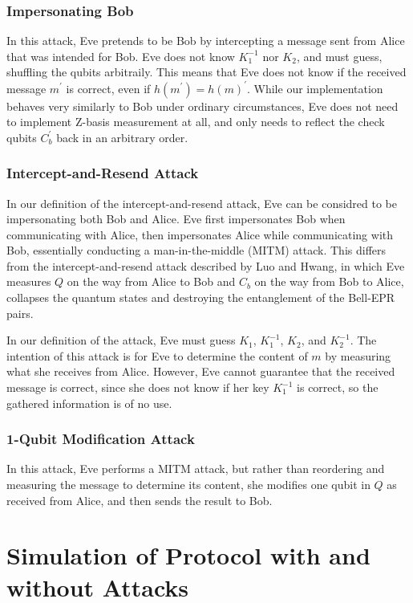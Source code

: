 \documentclass[conference,compsoc]{IEEEtran}
\begin{document}
\subsubsection{Impersonating Bob}

In this attack, Eve pretends to be Bob by intercepting a message sent from Alice that was
intended for Bob. Eve does not know $K_{1}^{-1}$ nor $K_{2}$, and must guess, shuffling the
qubits arbitraily. This means that Eve does not know if the received message $m^{\prime}$ is correct, even
if $h(m^{\prime}) = h(m)^{\prime}$. While our implementation behaves very similarly to Bob
under ordinary circumstances, Eve does not need to implement Z-basis measurement at all, and only needs
to reflect the check qubits $C_{b}^{\prime}$ back in an arbitrary order.

\subsubsection{Intercept-and-Resend Attack}

In our definition of the intercept-and-resend attack, Eve can be considred to
be impersonating both Bob and Alice. 
Eve first impersonates Bob when communicating with Alice, then impersonates
Alice while communicating with Bob, essentially conducting a man-in-the-middle (MITM) attack.
This differs from the intercept-and-resend attack described by Luo and Hwang, in which Eve measures $Q$
on the way from Alice to Bob and $C_{b}$ on the way from Bob to Alice, collapses the quantum
states and destroying the entanglement of the Bell-EPR pairs.

In our definition of the attack, Eve must guess $K_{1}$, $K_{1}^{-1}$, $K_{2}$, and $K_{2}^{-1}$.
The intention of this attack is for Eve to determine the content of $m$ by measuring what
she receives from Alice. However, Eve cannot guarantee that the received message is correct, since
she does not know if her key $K_{1}^{-1}$ is correct, so the gathered information is of no use.

\subsubsection{1-Qubit Modification Attack}

In this attack, Eve performs a MITM attack, but
rather than reordering and measuring the message to determine its content,
she modifies one qubit in $Q$ as received from Alice, and then sends the result to Bob.

\section{Simulation of Protocol with and without Attacks}
\end{document}

